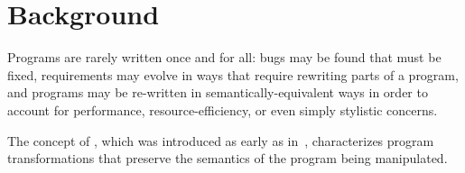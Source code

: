 \section{Background}\label{chick-background}

Programs are rarely written once and for all: bugs may be found that must be
fixed, requirements may evolve in ways that require rewriting parts of a
program, and programs may be re-written in semantically-equivalent ways in order
to account for performance, resource-efficiency, or even simply stylistic
concerns.

The concept of , which was introduced as early as
in~\citet{wirfs1990surveying}, characterizes program transformations that
preserve the semantics of the program being manipulated.

